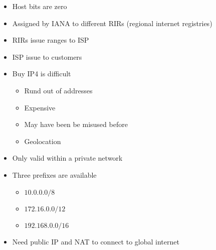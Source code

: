 \begin{itemize}
\begin{itemize}
\begin{itemize}
\begin{itemize}
\begin{itemize}
                                    \item Host bits are zero
                                \end{itemize}
                        \end{itemize}
                \end{itemize}
                    \begin{itemize}
                        \item Assigned by IANA to different RIRs (regional internet registries)
                        \item RIRs issue ranges to ISP
                        \item ISP issue to customers
                        \item Buy IP4 is difficult
                            \begin{itemize}
                                \item Rund out of addresses
                                \item Expensive
                                \item May have been be misused before
                                \item Geolocation
                            \end{itemize}
                    \end{itemize}
                    \begin{itemize}
                        \item Only valid within a private network
                        \item Three prefixes are available
                            \begin{itemize}
                                \item $10.0.0.0/8$
                                \item $172.16.0.0/12$
                                \item $192.168.0.0/16$
                            \end{itemize}
                        \item Need public IP and NAT to connect to global internet
                    \end{itemize}
        \end{itemize}
        \begin{itemize}

\end{itemize}
\end{itemize}
